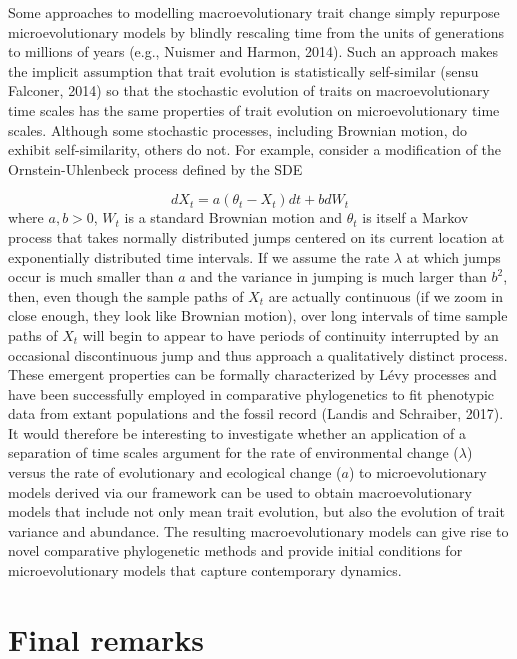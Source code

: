 \documentclass[]{elsarticle} %
\begin{document}
Some approaches to modelling macroevolutionary trait change simply
repurpose microevolutionary models by blindly rescaling time from the
units of generations to millions of years (e.g., Nuismer and Harmon,
2014). Such an approach makes the implicit assumption that trait
evolution is statistically self-similar (sensu Falconer, 2014) so that
the stochastic evolution of traits on macroevolutionary time scales has
the same properties of trait evolution on microevolutionary time scales.
Although some stochastic processes, including Brownian motion, do
exhibit self-similarity, others do not. For example, consider a
modification of the Ornstein-Uhlenbeck process defined by the SDE

\begin{equation}
dX_t=a(\theta_t-X_t)dt+bdW_t
\end{equation} where \(a,b>0\), \(W_t\) is a standard Brownian motion
and \(\theta_t\) is itself a Markov process that takes normally
distributed jumps centered on its current location at exponentially
distributed time intervals. If we assume the rate \(\lambda\) at which
jumps occur is much smaller than \(a\) and the variance in jumping is
much larger than \(b^2\), then, even though the sample paths of \(X_t\)
are actually continuous (if we zoom in close enough, they look like
Brownian motion), over long intervals of time sample paths of \(X_t\)
will begin to appear to have periods of continuity interrupted by an
occasional discontinuous jump and thus approach a qualitatively distinct
process. These emergent properties can be formally characterized by Lévy
processes and have been successfully employed in comparative
phylogenetics to fit phenotypic data from extant populations and the
fossil record (Landis and Schraiber, 2017). It would therefore be
interesting to investigate whether an application of a separation of
time scales argument for the rate of environmental change (\(\lambda\))
versus the rate of evolutionary and ecological change (\(a\)) to
microevolutionary models derived via our framework can be used to obtain
macroevolutionary models that include not only mean trait evolution, but
also the evolution of trait variance and abundance. The resulting
macroevolutionary models can give rise to novel comparative phylogenetic
methods and provide initial conditions for microevolutionary models that
capture contemporary dynamics.

\hypertarget{final-remarks}{%
\section{Final remarks}\label{final-remarks}}
\end{document}

